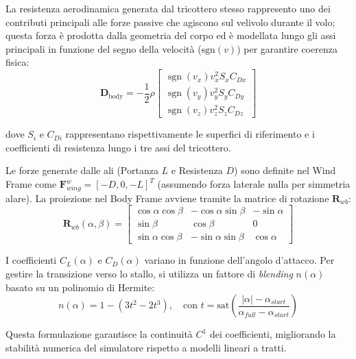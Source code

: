 La resistenza aerodinamica generata dal tricottero stesso rappresento uno dei contributi principali 
alle forze passive che agiscono sul velivolo durante il volo; questa forza è prodotta dalla geometria del corpo ed 
è modellata lungo gli assi principali in funzione del segno della velocità ($\text{sgn}(v)$) per garantire coerenza fisica:
\begin{equation}
    \bm{D}_{\text{body}} = -\frac{1}{2} \rho 
    \begin{bmatrix}
        \operatorname{sgn}(v_x) v_x^2 S_{x} C_{Dx} \\
        \operatorname{sgn}(v_y) v_y^2 S_{y} C_{Dy} \\
        \operatorname{sgn}(v_z) v_z^2 S_{z} C_{Dz}
    \end{bmatrix}
\end{equation}

dove $S_i$ e $C_{Di}$ rappresentano rispettivamente le superfici di riferimento e i coefficienti di resistenza lungo i tre assi del tricottero.

Le forze generate dalle ali (Portanza $L$ e Resistenza $D$) sono definite nel Wind Frame come $\bm{F}_{wing}^w = [-D, 0, -L]^T$ (assumendo forza laterale nulla per simmetria alare). La proiezione nel Body Frame avviene tramite la matrice di rotazione $\bm{R}_{wb}$:
\begin{equation}
    \bm{R}_{wb}(\alpha, \beta) = 
    \begin{bmatrix} 
    \cos\alpha \cos\beta & -\cos\alpha \sin\beta & -\sin\alpha \\ 
    \sin\beta & \cos\beta & 0 \\ 
    \sin\alpha \cos\beta & -\sin\alpha \sin\beta & \cos\alpha 
    \end{bmatrix}
\end{equation}

I coefficienti $C_L(\alpha)$ e $C_D(\alpha)$ variano in funzione dell'angolo d'attacco. Per gestire la transizione verso lo stallo, si utilizza un fattore di \textit{blending} $n(\alpha)$ basato su un polinomio di Hermite:
\begin{equation}
    n(\alpha) = 1 - (3t^2 - 2t^3), \quad \text{con } t = \text{sat}\left(\frac{|\alpha| - \alpha_{start}}{\alpha_{full} - \alpha_{start}}\right)
\end{equation}

Questa formulazione garantisce la continuità $C^1$ dei coefficienti, migliorando la stabilità numerica del simulatore rispetto a modelli lineari a tratti.

